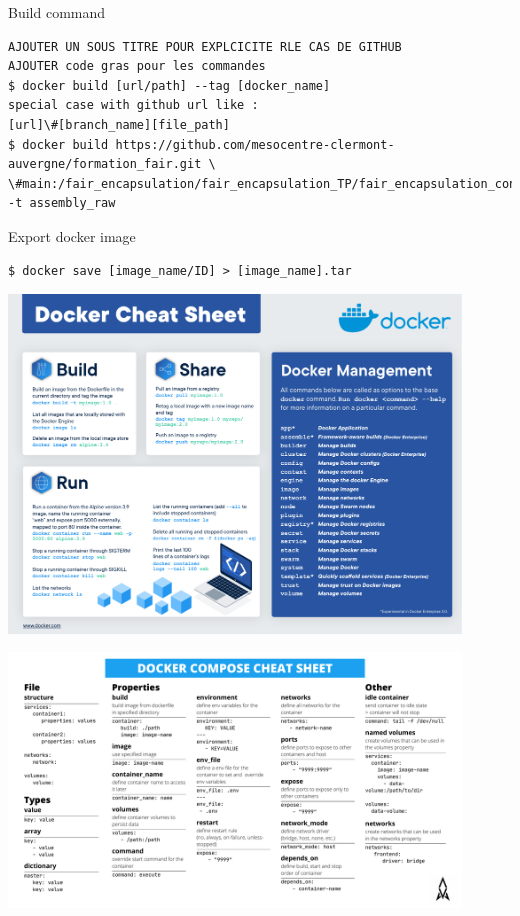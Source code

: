 \begin{frame}[fragile]{Build command}
\begin{verbatim}
AJOUTER UN SOUS TITRE POUR EXPLCICITE RLE CAS DE GITHUB
AJOUTER code gras pour les commandes
$ docker build [url/path] --tag [docker_name]
special case with github url like :
[url]\#[branch_name][file_path]
$ docker build https://github.com/mesocentre-clermont-auvergne/formation_fair.git \
\#main:/fair_encapsulation/fair_encapsulation_TP/fair_encapsulation_containers/fair_encapsulation_docker/docker_assembly_raw 
-t assembly_raw
\end{verbatim}
\end{frame}


\begin{frame}[fragile]{Export docker image}
\begin{verbatim}
$ docker save [image_name/ID] > [image_name].tar
\end{verbatim}
\end{frame}

\begin{frame}
\centering\includegraphics[width=0.9\textwidth]{docker-cheat-sheet.pdf}
\end{frame}

\begin{frame}
\centering\includegraphics[width=0.9\textwidth]{docker-compose-cheat-sheet.pdf}
\end{frame}

